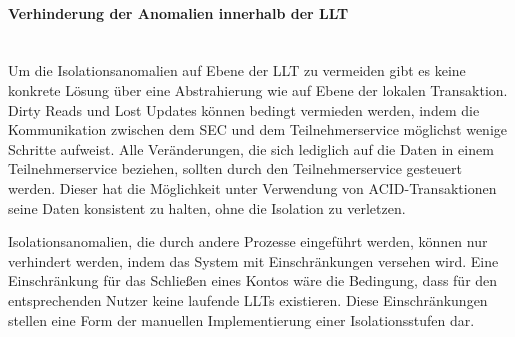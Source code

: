\paragraph*{Verhinderung der Anomalien innerhalb der LLT} \mbox{} \\
Um die Isolationsanomalien auf Ebene der LLT zu vermeiden gibt es keine konkrete Lösung über eine Abstrahierung wie auf Ebene der lokalen Transaktion. Dirty Reads und Lost Updates können bedingt vermieden werden, indem die Kommunikation zwischen dem SEC und dem Teilnehmerservice möglichst wenige Schritte aufweist. Alle Veränderungen, die sich lediglich auf die Daten in einem Teilnehmerservice beziehen, sollten durch den Teilnehmerservice gesteuert werden. Dieser hat die Möglichkeit unter Verwendung von ACID-Transaktionen seine Daten konsistent zu halten, ohne die Isolation zu verletzen.

Isolationsanomalien, die durch andere Prozesse eingeführt werden, können nur verhindert werden, indem das System mit Einschränkungen versehen wird. Eine Einschränkung für das Schließen eines Kontos wäre die Bedingung, dass für den entsprechenden Nutzer keine laufende LLTs existieren. Diese Einschränkungen stellen eine Form der manuellen Implementierung einer Isolationsstufen dar.
